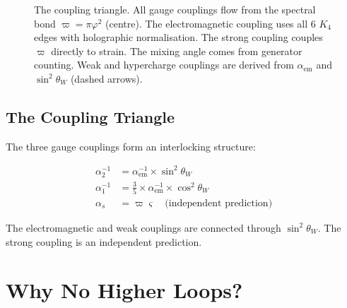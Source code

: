 \documentclass[11pt,a4paper]{article}
\theoremstyle{definition}
\newcommand{\gs}{\varsigma}
\begin{document}
\begin{figure}[!htbp]
\caption{The coupling triangle. All gauge couplings flow from the spectral bond $\varpi = \pi\varphi^2$ (centre). The electromagnetic coupling uses all 6 $K_4$ edges with holographic normalisation. The strong coupling couples $\varpi$ directly to strain. The mixing angle comes from generator counting. Weak and hypercharge couplings are derived from $\alpha_{\text{em}}$ and $\sin^2\theta_W$ (dashed arrows).}
\label{fig:triangle}
\end{figure}

\subsection{The Coupling Triangle}

The three gauge couplings form an interlocking structure:

\begin{align}
\alpha^{-1}_2 &= \alpha^{-1}_{\text{em}} \times \sin^2\theta_W \label{eq:alpha2}\\
\alpha^{-1}_1 &= \tfrac{3}{5} \times \alpha^{-1}_{\text{em}} \times \cos^2\theta_W \label{eq:alpha1}\\
\alpha_s &= \varpi\gs \quad\text{(independent prediction)} \label{eq:alpha3_ind}
\end{align}

The electromagnetic and weak couplings are connected through $\sin^2\theta_W$. The strong coupling is an independent prediction.

\section{Why No Higher Loops?}
\label{sec:nohigher}
\end{document}
